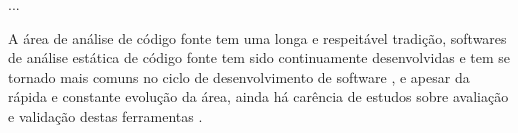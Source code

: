 ...

% 

A área de análise de código
fonte tem uma longa e respeitável tradição, softwares de análise estática de
código fonte tem sido continuamente desenvolvidas e tem se tornado mais comuns
no ciclo de desenvolvimento de software \cite{Novak2010}, e apesar da rápida e
constante evolução da área, ainda há carência de estudos sobre avaliação e
validação destas ferramentas \cite{Li2010, ilyas2016static}.

